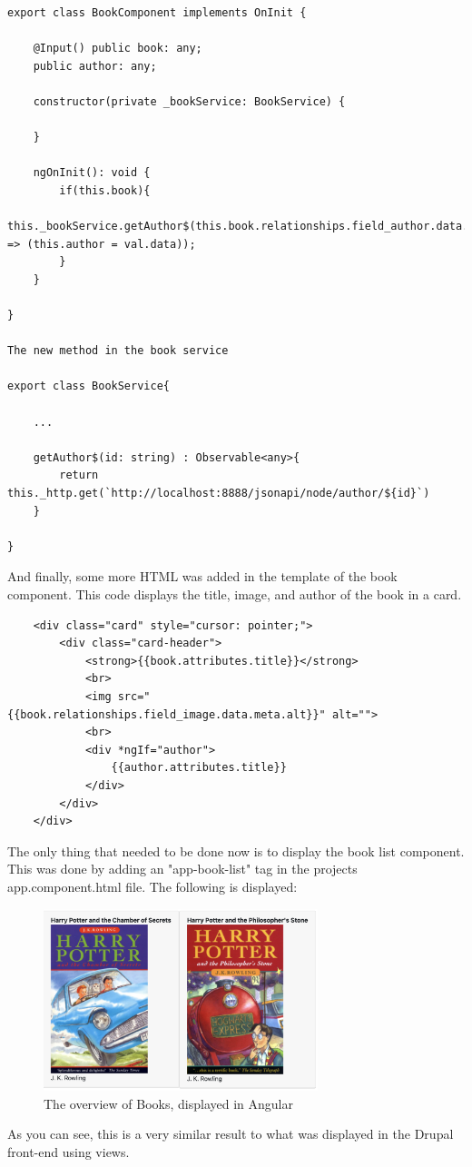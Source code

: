 \begin{lstlisting}
export class BookComponent implements OnInit {
	
	@Input() public book: any;
	public author: any;
	
	constructor(private _bookService: BookService) {
		
	}
	
	ngOnInit(): void {
		if(this.book){
			this._bookService.getAuthor$(this.book.relationships.field_author.data.id).subscribe(val => (this.author = val.data));
		}
	}
	
}

The new method in the book service

export class BookService{
	
	...
	
	getAuthor$(id: string) : Observable<any>{
		return this._http.get(`http://localhost:8888/jsonapi/node/author/${id}`)
	}
	
}
\end{lstlisting}

And finally, some more HTML was added in the template of the book component. This code displays the title, image, and author of the book in a card.

\begin{lstlisting}
	<div class="card" style="cursor: pointer;">
		<div class="card-header">
			<strong>{{book.attributes.title}}</strong>
			<br>
			<img src="{{book.relationships.field_image.data.meta.alt}}" alt="">
			<br>
			<div *ngIf="author">
				{{author.attributes.title}}
			</div>
		</div>
	</div>
\end{lstlisting}

The only thing that needed to be done now is to display the book list component. This was done by adding an "app-book-list" tag in the projects app.component.html file. The following is displayed: 


\begin{figure}[h]
	\centering
	\includegraphics[width=8cm]{./img/Angular_Books.png}
	\caption[Display of a list of Books in Angular]{The overview of Books, displayed in Angular}
	\label{fig:BooksAngular}
\end{figure}

As you can see, this is a very similar result to what was displayed in the Drupal front-end using views.
